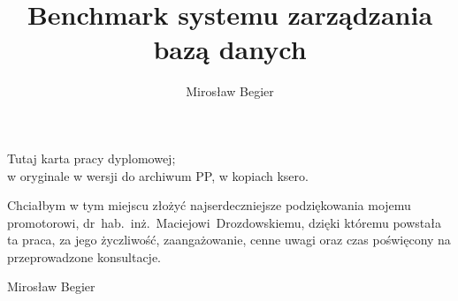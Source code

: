 \documentclass[polish,a4paper,oneside]{../fcm-unofficial/ppfcmthesis}
\author{Mirosław Begier}
\title{Benchmark systemu zarządzania bazą danych}
\begin{document}
% 

\maketitle\cleardoublepage%
\thispagestyle{empty}\vspace*{\fill}\noindent\begin{center}%
Tutaj karta pracy dyplomowej;\\w oryginale w wersji do archiwum PP, w kopiach ksero.\end{center}\vfill\cleardoublepage%
\thispagestyle{empty}\vspace*{\fill}\vfill\noindent
\hspace{2cm}Chciałbym w tym miejscu złożyć najserdeczniejsze podziękowania mojemu promotorowi, dr~hab.~inż.~Maciejowi~Drozdowskiemu, 
dzięki któremu powstała ta praca, za jego życzliwość, zaangażowanie, cenne uwagi oraz czas poświęcony na przeprowadzone konsultacje.
\\
\begin{flushright}
Mirosław Begier
\end{flushright}
\cleardoublepage%
\frontmatter{}\cleardoublepage%

\mainmatter%










{\small}

\backmatter%
 
 
\end{document}
